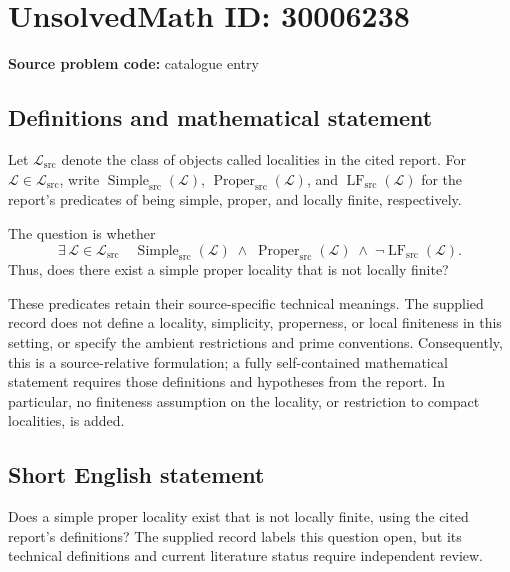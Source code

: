 \documentclass[11pt]{article}
\begin{document}
\section*{UnsolvedMath ID: 30006238}
\textbf{Source problem code:} catalogue entry
\subsection{Definitions and mathematical statement}
Let \(\mathscr L_{\mathrm{src}}\) denote the class of objects called localities in the cited report. For \(\mathcal L\in\mathscr L_{\mathrm{src}}\), write \(\operatorname{Simple}_{\mathrm{src}}(\mathcal L)\), \(\operatorname{Proper}_{\mathrm{src}}(\mathcal L)\), and \(\operatorname{LF}_{\mathrm{src}}(\mathcal L)\) for the report's predicates of being simple, proper, and locally finite, respectively.

The question is whether
\[
\exists\,\mathcal L\in\mathscr L_{\mathrm{src}}\quad
\operatorname{Simple}_{\mathrm{src}}(\mathcal L)
\;\land\;
\operatorname{Proper}_{\mathrm{src}}(\mathcal L)
\;\land\;
\neg\operatorname{LF}_{\mathrm{src}}(\mathcal L).
\]
Thus, does there exist a simple proper locality that is not locally finite?

These predicates retain their source-specific technical meanings. The supplied record does not define a locality, simplicity, properness, or local finiteness in this setting, or specify the ambient restrictions and prime conventions. Consequently, this is a source-relative formulation; a fully self-contained mathematical statement requires those definitions and hypotheses from the report. In particular, no finiteness assumption on the locality, or restriction to compact localities, is added.
\subsection{Short English statement}
Does a simple proper locality exist that is not locally finite, using the cited report's definitions? The supplied record labels this question open, but its technical definitions and current literature status require independent review.
\end{document}

